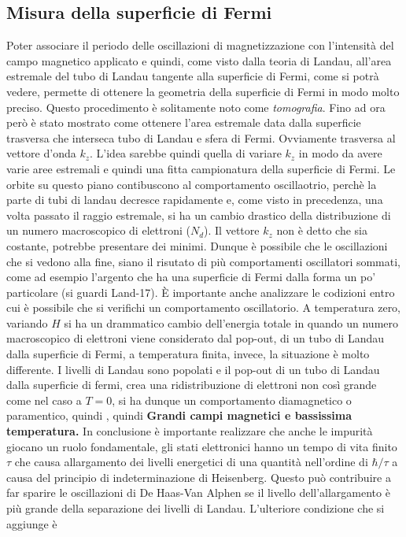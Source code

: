 \subsection{Misura della superficie di Fermi}
Poter associare il periodo delle oscillazioni di magnetizzazione con l'intensit\`a del campo magnetico applicato e quindi, come visto dalla teoria di Landau, all'area estremale del tubo di Landau tangente alla superficie di Fermi, come si potr\`a vedere, permette di ottenere la geometria della superficie di Fermi in modo molto preciso. Questo procedimento \`e solitamente noto come \textit{tomografia}. Fino ad ora per\`o \`e stato mostrato come ottenere l'area estremale data dalla superficie trasversa che interseca tubo di Landau e sfera di Fermi. Ovviamente trasversa al vettore d'onda $k_z$. L'idea sarebbe quindi quella di variare $k_z$ in modo da avere varie aree estremali e quindi una fitta campionatura della superficie di Fermi. Le orbite su questo piano contibuscono al comportamento oscillaotrio, perch\`e  la parte di tubi di landau decresce rapidamente e, come visto in precedenza, una volta passato il raggio estremale, si ha un cambio drastico della distribuzione di un numero macroscopico di elettroni ($N_d$). Il vettore $k_z$ non \`e detto che sia costante, potrebbe presentare dei minimi. Dunque \`e possibile che le oscillazioni che si vedono alla fine, siano il risutato di pi\`u comportamenti oscillatori sommati, come ad esempio l'argento che ha una superficie di Fermi dalla forma un po' particolare (si guardi Land-17).
\`E importante anche analizzare le codizioni entro cui \`e possibile che si verifichi un comportamento oscillatorio. A temperatura zero, variando $H$ si ha un drammatico cambio dell'energia totale in quando un numero macroscopico di elettroni viene considerato dal pop-out, di un tubo di Landau dalla superficie di Fermi, a temperatura finita, invece, la situazione \`e molto differente. I livelli di Landau sono popolati e il pop-out di un tubo di Landau dalla superficie di fermi, crea una ridistribuzione di elettroni non cos\`i grande come nel caso a $T=0$, si ha dunque un comportamento diamagnetico o paramentico, quindi
,
quindi \textbf{Grandi campi magnetici e bassissima temperatura.} In conclusione \`e importante realizzare che anche le impurit\`a giocano un ruolo fondamentale, gli stati elettronici hanno un tempo di vita finito $\tau$ che causa allargamento dei livelli energetici di una quantit\`a nell'ordine di $\hbar/\tau$ a causa del principio di indeterminazione di Heisenberg. Questo pu\`o contribuire a far sparire le oscillazioni di De Haas-Van Alphen se il livello dell'allargamento \`e pi\`u grande della separazione dei livelli di Landau. L'ulteriore condizione che si aggiunge \`e 







